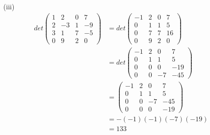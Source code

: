 \documentclass[11pt]{report}
\begin{document}
\begin{itemize}
\item[(iii)]
\begin{align}
det 
\begin{pmatrix} 
1 & 2 & 0 & 7 \\
2 & -3 & 1 & -9 \\
3 & 1 & 7 & -5 \\
0 & 9 & 2 & 0
\end{pmatrix} &= det
\begin{pmatrix} 
-1 & 2 & 0 & 7 \\
0 & 1 & 1 & 5 \\
0 & 7 & 7 & 16 \\
0 & 9 & 2 & 0
\end{pmatrix} \\
&= det 
\begin{pmatrix} 
-1 & 2 & 0 & 7 \\
0 & 1 & 1 & 5 \\
0 & 0 & 0 & -19 \\
0 & 0 & -7 & -45
\end{pmatrix} \\
&= 
\begin{pmatrix} 
-1 & 2 & 0 & 7 \\
0 & 1 & 1 & 5 \\
0 & 0 & -7 & -45 \\
0 & 0 & 0 & -19
\end{pmatrix} \\
&= -(-1)(-1)(-7)(-19) \\ &= 133
\end{align}
\end{itemize}
\end{document}
